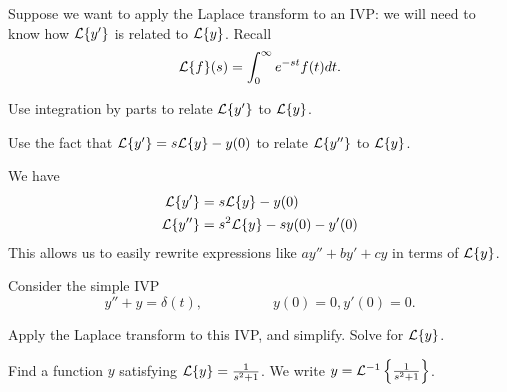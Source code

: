 \begin{applicationActivities}
\begin{activity}{10}
Suppose we want to apply the Laplace transform to an IVP: we will need to know how \(\mathcal{L}\{y'\}\) is related to \(\mathcal{L}\{y\}\).  Recall
\[\mathcal{L}\{f\}(s)=\int _0 ^\infty e^{-st}f(t)dt.\]
\vfill
\begin{subactivity}
Use integration by parts to relate \(\mathcal{L}\{y'\}\) to \(\mathcal{L}\{y\}\).
\end{subactivity}
\begin{subactivity}
Use the fact that \(\mathcal{L}\{y'\}=s\mathcal{L}\{y\}-y(0)\) to relate \(\mathcal{L}\{y''\}\) to \(\mathcal{L}\{y\}\).
\end{subactivity}
\end{activity}

\begin{observation}
We have
\begin{align*}
\mathcal{L}\{y'\} &= s\mathcal{L}\{y\}-y(0) \\
\mathcal{L}\{y''\} &= s^2\mathcal{L}\{y\}-sy(0)-y'(0) 
\end{align*}
\vfill
This allows us to easily rewrite expressions like \(ay''+by'+cy\) in terms of \(\mathcal{L}\{y\}\).
\end{observation}

\begin{activity}{15}
Consider the simple IVP
\[y''+y=\delta(t),\hspace{5em} y(0)=0, y'(0)=0.\]
\begin{subactivity}
Apply the Laplace transform to this IVP, and simplify.  Solve for \(\mathcal{L}\{y\}\).
\end{subactivity}
\begin{subactivity}
Find a function \(y\) satisfying \(\mathcal{L}\{y\}=\frac{1}{s^2+1}\).  We write \(y=\mathcal{L}^{-1}\left\{\frac{1}{s^2+1}\right\}\).
\end{subactivity}
\end{activity}


\end{applicationActivities}
